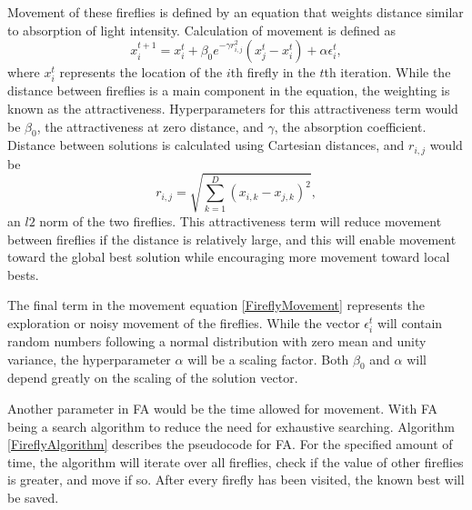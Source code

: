 \documentclass[conference]{IEEEtran}
\begin{document}
    Movement of these fireflies is defined by an equation that weights distance similar to absorption of light intensity. Calculation of movement is defined as 
    \begin{equation}
    \label{FireflyMovement}
        x^{t+1}_i = x^t_i + \beta_0 e^{-\gamma r^2_{i,j}} (x^t_j - x^t_i) + \alpha \epsilon^t_i,
    \end{equation}
    where $x^t_i$ represents the location of the $i$th firefly in the $t$th iteration. While the distance between fireflies is a main component in the equation, the weighting is known as the attractiveness. Hyperparameters for this attractiveness term would be $\beta_0$, the attractiveness at zero distance, and $\gamma$, the absorption coefficient. Distance between solutions is calculated using Cartesian distances, and $r_{i,j}$ would be 
    \begin{equation}
    \label{CartesianDistance}
        r_{i,j} = \sqrt{\sum_{k=1}^{D} (x_{i,k} - x_{j,k})^2},
    \end{equation}
    an $l2$ norm of the two fireflies. This attractiveness term will reduce movement between fireflies if the distance is relatively large, and this will enable movement toward the global best solution while encouraging more movement toward local bests.

    The final term in the movement equation \ref{FireflyMovement} represents the exploration or noisy movement of the fireflies. While the vector $\epsilon^t_i$ will contain random numbers following a normal distribution with zero mean and unity variance, the hyperparameter $\alpha$ will be a scaling factor. Both $\beta_0$ and $\alpha$ will depend greatly on the scaling of the solution vector.

    Another parameter in FA would be the time allowed for movement. With FA being a search algorithm to reduce the need for exhaustive searching. Algorithm \ref{FireflyAlgorithm} describes the pseudocode for FA. For the specified amount of time, the algorithm will iterate over all fireflies, check if the value of other fireflies is greater, and move if so. After every firefly has been visited, the known best will be saved.
\end{document}
